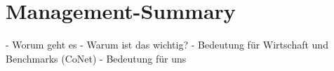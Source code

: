\section{Management-Summary}

- Worum geht es 
- Warum ist das wichtig?
- Bedeutung für Wirtschaft und Benchmarks (CoNet)
- Bedeutung für uns

